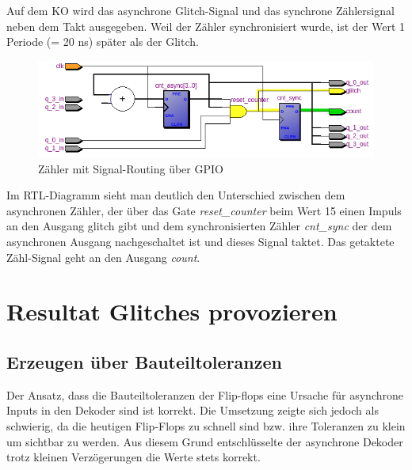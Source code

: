 Auf dem KO wird das asynchrone Glitch-Signal und das synchrone Zählersignal neben dem Takt ausgegeben. Weil der Zähler synchronisiert wurde, ist der Wert 1 Periode (= 20 ns) später als der Glitch.\\

\begin{figure}[H]
	\centering
	\includegraphics[width=\textwidth]{images/glitch/RTL_glitch_detection_bemalt.png}
	\caption{Zähler mit Signal-Routing über GPIO}
	\label{fig.glitch.routing}
\end{figure}
Im RTL-Diagramm sieht man deutlich den Unterschied zwischen dem asynchronen Zähler, der über das Gate \textit{reset\_{counter}} beim Wert 15 einen Impuls an den Ausgang glitch gibt und dem synchronisierten Zähler \textit{cnt\_{sync}} der dem asynchronen Ausgang nachgeschaltet ist und dieses Signal taktet. Das getaktete Zähl-Signal geht an den Ausgang \textit{count}.


	
\section{Resultat Glitches provozieren}\label{sect.glitch_resultat}

\subsection{Erzeugen über Bauteiltoleranzen}
Der Ansatz, dass die Bauteiltoleranzen der Flip-flops eine Ursache für asynchrone Inputs in den Dekoder sind ist korrekt. Die Umsetzung zeigte sich jedoch als schwierig, da die heutigen Flip-Flops zu schnell sind bzw. ihre Toleranzen zu klein um sichtbar zu werden.  Aus diesem Grund entschlüsselte der asynchrone Dekoder trotz kleinen Verzögerungen die Werte stets korrekt.\\



